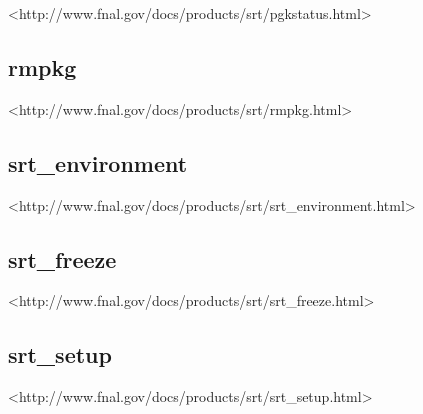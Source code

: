 <http://www.fnal.gov/docs/products/srt/pgkstatus.html>


\subsection{rmpkg}
\label{com_rmpkg}

<http://www.fnal.gov/docs/products/srt/rmpkg.html>


\subsection{srt\_environment}
\label{com_srt_environment}

<http://www.fnal.gov/docs/products/srt/srt\_environment.html>


\subsection{srt\_freeze}
\label{com_srt_freeze}

<http://www.fnal.gov/docs/products/srt/srt\_freeze.html>


\subsection{srt\_setup}
\label{com_srt_setup}

<http://www.fnal.gov/docs/products/srt/srt\_setup.html>

\label{com_depend}
